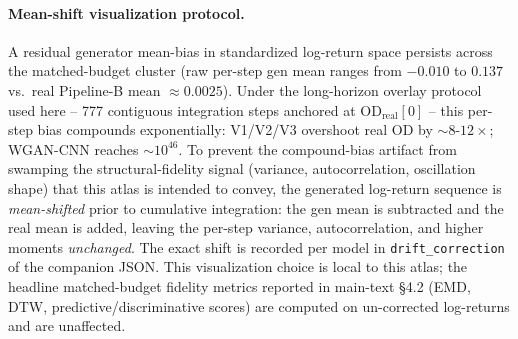 \paragraph{Mean-shift visualization protocol.}
A residual generator mean-bias in standardized log-return space
persists across the matched-budget cluster (raw per-step gen
mean ranges from $-0.010$ to $0.137$ vs.\ real Pipeline-B mean
$\approx 0.0025$). Under the long-horizon overlay protocol used
here -- 777 contiguous integration steps anchored at
$\text{OD}_{\text{real}}[0]$ -- this per-step bias compounds
exponentially: V1/V2/V3 overshoot real OD by $\sim 8$-$12\times$;
WGAN-CNN reaches $\sim\!10^{46}$. To prevent the compound-bias
artifact from swamping the structural-fidelity signal
(variance, autocorrelation, oscillation shape) that this atlas
is intended to convey, the generated log-return sequence is
\emph{mean-shifted} prior to cumulative integration: the gen
mean is subtracted and the real mean is added, leaving the
per-step variance, autocorrelation, and higher moments
\emph{unchanged}. The exact shift is recorded per model in
\texttt{drift\_correction} of the companion JSON. This
visualization choice is local to this atlas; the headline
matched-budget fidelity metrics reported in main-text \S 4.2
(EMD, DTW, predictive/discriminative scores) are computed on
un-corrected log-returns and are unaffected.

